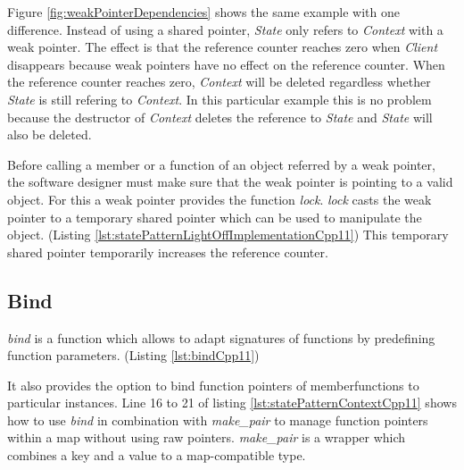 {\noindent Figure \ref{fig:weakPointerDependencies} shows the same example with one difference. Instead of using a shared pointer, \emph{State} only refers to \emph{Context} with a weak pointer. The effect is that the reference counter reaches zero when \emph{Client} disappears because weak pointers have no effect on the reference counter. When the reference counter reaches zero, \emph{Context} will be deleted regardless whether \emph{State} is still refering to \emph{Context}. In this particular example this is no problem because the destructor of \emph{Context} deletes the reference to \emph{State} and \emph{State} will also be deleted. 

\FloatBarrier
\noindent Before calling a member or a function of an object referred by a weak pointer, the software designer must make sure that the weak pointer is pointing to a valid object. For this a weak pointer provides the function \emph{lock}. \emph{lock} casts the weak pointer to a temporary shared pointer which can be used to manipulate the object. (Listing \ref{lst:statePatternLightOffImplementationCpp11}) This temporary shared pointer temporarily increases the reference counter.

\FloatBarrier


\subsection{Bind}\label{sec:bind}
 \noindent \emph{bind} is a function which allows to adapt signatures of functions by predefining function parameters. (Listing \ref{lst:bindCpp11})
 


\noindent It also provides the option to bind function pointers of memberfunctions to particular instances. \cite[cf.][169 - 172]{Pohmann2013} Line 16 to 21 of listing \ref{lst:statePatternContextCpp11} shows how to use \emph{bind} in combination with \emph{make\_pair} to manage function pointers within a map without using raw pointers. \emph{make\_pair} is a wrapper which combines a key and a value to a map-compatible type. 
 
}
